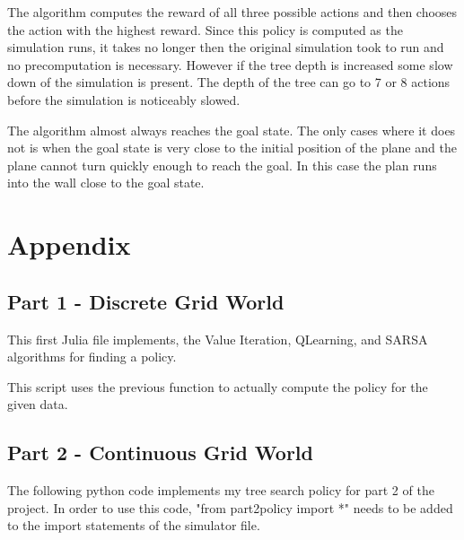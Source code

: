 \documentclass[12pt, oneside]{article}
\begin{document}
    The algorithm computes the reward of all three possible actions and then
    chooses the action with the highest reward.
    Since this policy is computed as the simulation runs, it takes no longer then
    the original simulation took to run and no precomputation is necessary.
    However if the tree depth is increased some slow down of the simulation is
    present. The depth of the tree can go to 7 or 8 actions before the simulation 
    is noticeably slowed.

    The algorithm almost always reaches the goal state.
    The only cases where it does not is when the goal state is very close to the
    initial position of the plane and the plane cannot turn quickly enough to
    reach the goal.
    In this case the plan runs into the wall close to the goal state.

\section{Appendix}
  \subsection{Part 1 - Discrete Grid World}
    This first Julia file implements, the Value Iteration, QLearning, and SARSA
    algorithms for finding a policy.
    
    This script uses the previous function to actually compute the policy
    for the given data.
    

  \subsection{Part 2 - Continuous Grid World}
    The following python code implements my tree search policy
    for part 2 of the project.
    In order to use this code,
    "from part2policy import *" needs to be added to the import statements of
    the simulator file.
    
\end{document}
